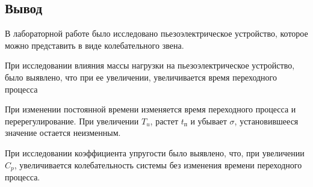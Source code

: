 \documentclass[a4paper, 12pt]{article}
\begin{document}
\newpage

\begin{center}
	\section*{Вывод}
\end{center}\par
В лабораторной работе было исследовано пьезоэлектрическое устройство, которое можно представить в виде колебательного звена.\par
При исследовании влияния массы нагрузки на пьезоэлектрическое устройство, было выявлено, что при ее увеличении, увеличивается время переходного процесса\par
При изменении постоянной времени изменяется время переходного процесса и перерегулирование. При увеличении $T_u$, растет $t_\text{п}$ и убывает $\sigma$, установившееся значение остается неизменным.\par
При исследовании коэффициента упругости было выявлено, что, при увеличении $C_p$, увеличивается колебательность системы без изменения времени переходного процесса.
\end{document}

